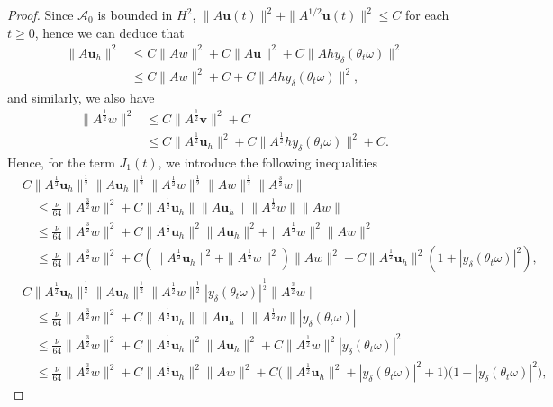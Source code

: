 \documentclass[10pt,a4paper]{amsart}
\begin{document}
\begin{proof}
Since $\mathcal{A}_0$ is bounded in $H^2$,  $\|A\textbf{u}(t) \|^2+\|A^{1/2}\textbf{u}(t) \|^2\leq C$ for each $t\geq 0$, hence we can deduce that
\begin{align}\label{4.15}
\|A\textbf{u}_h\|^2&\leq C\|Aw\|^2+C\|A\textbf{u}\|^2
 +  C\|Ahy_\delta(\theta_t\omega)\|^2 \nonumber \\
&
\leq C\|Aw\|^2+  C  +C \|Ahy_\delta(\theta_t\omega)\|^2
,
\end{align}
and similarly, we also have
\begin{align}  \label{mar5.3}
  \|A^{\frac 12}w\|^2
   &\leq  C\|A^{\frac 12} \textbf{v}\|^2 +C
   \nonumber  \\
   &\leq C\|A^{\frac 12} \textbf{u}_h\|^2 + C\|A^{\frac 12} hy_\delta(\theta_t\omega) \|^2 +C .
\end{align}
Hence,  for  the term $J_1(t)$, we introduce the following inequalities
\begin{align*}
  &C\|A^\frac12\textbf{u}_h\|^\frac12\|A\textbf{u}_h\|^\frac12\|A^\frac12w\|^\frac12
\|Aw\|^\frac12\|A^\frac32w\|
& \nonumber\\
&\quad  \leq    \frac \nu {64}\|A^\frac32w\|^2  + C \|A^\frac12\textbf{u}_h\|  \|A \textbf{u}_h\|   \|A^{\frac 12} w\|  \|Aw\|
\nonumber
\\
&\quad  \leq   \frac \nu {64}\|A^\frac32w\|^2
+ C \|A^\frac12\textbf{u}_h\|^2  \|A \textbf{u}_h\|^2+      \|A^{\frac 12} w\|^2 \|Aw\|^2
\nonumber
\\
&\quad  \leq    \frac \nu {64} \|A^\frac32w\|^2
+ C\left( \|A^\frac12\textbf{u}_h\|^2 +  \|A^\frac 12 w   \|^2  \right) \|A w\|^ 2
+ C  \|A^\frac12\textbf{u}_h\|^2   \left(  1+ |y_\delta(\theta_t\omega) |^2  \right) ,
\end{align*}
\begin{align*}
  &C\|A^\frac12\textbf{u}_h\|^\frac12\|A\textbf{u}_h\|^\frac12\|A^\frac12w\|^\frac12
 |y_\delta(\theta_t\omega)|^\frac12\|A^\frac32w\|
& \nonumber\\
&\quad  \leq   \frac \nu {64}\|A^\frac32w\|^2  + C \|A^\frac12\textbf{u}_h\|  \|A \textbf{u}_h\|   \|A^{\frac 12} w\| |y_\delta(\theta_t\omega) |
\nonumber
\\
& \quad  \leq    \frac \nu {64}\|A^\frac32w\|^2
+ C \|A^\frac12\textbf{u}_h\|^2  \|A \textbf{u}_h\|^2+   C   \|A^{\frac 12} w\|^2 |y_\delta(\theta_t\omega) |^2
\nonumber
\\
&\quad \leq      \frac \nu {64}\|A^\frac32w\|^2
+ C  \|A^\frac12\textbf{u}_h\|^2  \|A w\|^2  + C \big(  \|A^\frac12\textbf{u}_h\|^2 +|y_\delta(\theta_t\omega) |^2 +1\big) \big(  1+|y_\delta(\theta_t\omega) |^2  \big)  ,
\end{align*}


\end{proof}
\end{document}
